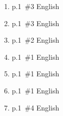 \documentclass[a4paper,11pt]{jsarticle}
\begin{document}
\begin{enumerate}
  \setlength{\itemsep}{2truecm}
  \item
    p.1~\#3 English
  \item
    p.1~\#3 English
  \item
    p.1~\#2 English
  \item
    p.1~\#1 English
  \item
    p.1~\#1 English
  \item
    p.1~\#1 English
  \item
    p.1~\#4 English
\end{enumerate}
\end{document}

